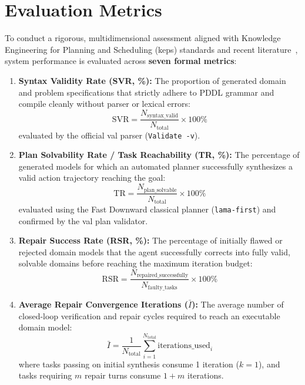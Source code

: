 \section{Evaluation Metrics}
\label{sec:eval_metrics}
To conduct a rigorous, multidimensional assessment aligned with Knowledge Engineering for Planning and Scheduling (\gls{keps}) standards and recent literature~\cite{rosa2026grounded,oswald2024,bavandpour2026llmonly,balyo2026whichllm}, system performance is evaluated across \textbf{seven formal metrics}:

\begin{enumerate}
    \item \textbf{Syntax Validity Rate (SVR, \%):}
    The proportion of generated domain and problem specifications that strictly adhere to PDDL grammar and compile cleanly without parser or lexical errors:
    \begin{equation}
        \text{SVR} = \frac{N_{\text{syntax\_valid}}}{N_{\text{total}}} \times 100\%
    \end{equation}
    evaluated by the official \gls{val} parser (\texttt{Validate -v}).

    \item \textbf{Plan Solvability Rate / Task Reachability (TR, \%):}
    The percentage of generated models for which an automated planner successfully synthesizes a valid action trajectory reaching the goal:
    \begin{equation}
        \text{TR} = \frac{N_{\text{plan\_solvable}}}{N_{\text{total}}} \times 100\%
    \end{equation}
    evaluated using the Fast Downward classical planner (\texttt{lama-first}) and confirmed by the \gls{val} plan validator.

    \item \textbf{Repair Success Rate (RSR, \%):}
    The percentage of initially flawed or rejected domain models that the agent successfully corrects into fully valid, solvable domains before reaching the maximum iteration budget:
    \begin{equation}
        \text{RSR} = \frac{N_{\text{repaired\_successfully}}}{N_{\text{faulty\_tasks}}} \times 100\%
    \end{equation}

    \item \textbf{Average Repair Convergence Iterations ($\bar{I}$):}
    The average number of closed-loop verification and repair cycles required to reach an executable domain model:
    \begin{equation}
        \bar{I} = \frac{1}{N_{\text{total}}} \sum_{i=1}^{N_{\text{total}}} \text{iterations\_used}_i
    \end{equation}
    where tasks passing on initial synthesis consume 1 iteration ($k=1$), and tasks requiring $m$ repair turns consume $1+m$ iterations.


\end{enumerate}
